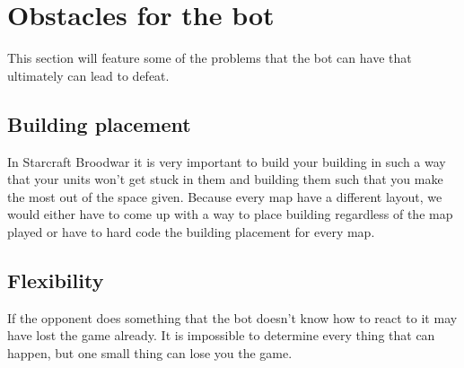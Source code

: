 \section{Obstacles for the bot}
	This section will feature some of the problems that the bot can have that ultimately can lead to defeat.
	\subsection*{Building placement}
		In Starcraft Broodwar it is very important to build your building in such a 
		way that your units won't get stuck in them and building them such that you make the most out of the space given. Because every map have 
		a different layout, we would either have to come up with a way to place building regardless of the map played or have to hard code the building 
		placement for every map.
	
	\subsection*{Flexibility}
		If the opponent does something that the bot doesn't know how to react to it may have lost the game already. 
		It is impossible to determine every 
		thing that can happen, but one small thing can lose you the game. 